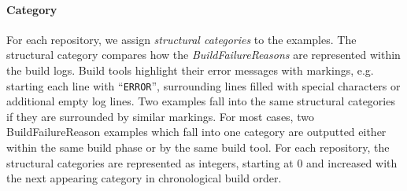 \documentclass[\myrootdir/main.tex]{subfiles}
\begin{document}
\paragraph{Category}
For each repository, we assign \emph{structural categories} to the examples.
The structural category compares how the \emph{BuildFailureReasons} are represented within the build logs.
Build tools highlight their error messages with markings, e.g. starting each line with ``\texttt{ERROR}'', surrounding lines filled with special characters or additional empty log lines.
Two examples fall into the same structural categories if they are surrounded by similar markings.
For most cases, two BuildFailureReason examples which fall into one category are outputted either within the same build phase or by the same build tool.
For each repository, the structural categories are represented as integers, starting at 0 and increased with the next appearing category in chronological build order.



\end{document}
